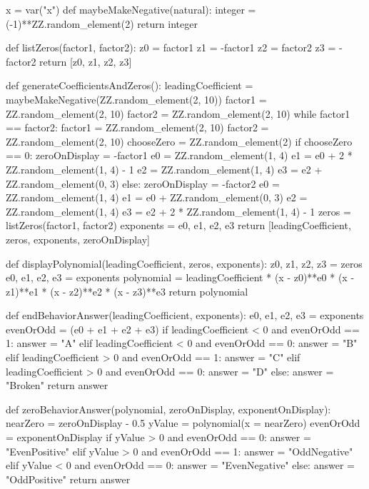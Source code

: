 \documentclass{ximera}
\begin{document}
\begin{sagesilent}
x = var("x")
def maybeMakeNegative(natural):
    integer = (-1)**ZZ.random_element(2)
    return integer 

def listZeros(factor1, factor2):
    z0 = factor1
    z1 = -factor1
    z2 = factor2
    z3 = -factor2
    return [z0, z1, z2, z3]

def generateCoefficientsAndZeros():
    leadingCoefficient = maybeMakeNegative(ZZ.random_element(2, 10))
    factor1 = ZZ.random_element(2, 10)
    factor2 = ZZ.random_element(2, 10)
    while factor1 == factor2:
        factor1 = ZZ.random_element(2, 10)
        factor2 = ZZ.random_element(2, 10)
    chooseZero = ZZ.random_element(2)
    if chooseZero == 0:
        zeroOnDisplay = -factor1
        e0 = ZZ.random_element(1, 4)
        e1 = e0 + 2 * ZZ.random_element(1, 4) - 1
        e2 = ZZ.random_element(1, 4)
        e3 = e2 + ZZ.random_element(0, 3)
    else: 
        zeroOnDisplay = -factor2
        e0 = ZZ.random_element(1, 4)
        e1 = e0 + ZZ.random_element(0, 3)
        e2 = ZZ.random_element(1, 4)
        e3 = e2 + 2 * ZZ.random_element(1, 4) - 1
    zeros = listZeros(factor1, factor2)
    exponents = e0, e1, e2, e3
    return [leadingCoefficient, zeros, exponents, zeroOnDisplay]

def displayPolynomial(leadingCoefficient, zeros, exponents):
    z0, z1, z2, z3 = zeros
    e0, e1, e2, e3 = exponents 
    polynomial = leadingCoefficient * (x - z0)**e0 * (x - z1)**e1 * (x - z2)**e2 * (x - z3)**e3
    return polynomial 

def endBehaviorAnswer(leadingCoefficient, exponents):
    e0, e1, e2, e3 = exponents 
    evenOrOdd = (e0 + e1 + e2 + e3) %
    if leadingCoefficient < 0 and evenOrOdd == 1:
        answer = "A"
    elif leadingCoefficient < 0 and evenOrOdd == 0:
        answer = "B"
    elif leadingCoefficient > 0 and evenOrOdd == 1:
        answer = "C"
    elif leadingCoefficient > 0 and evenOrOdd == 0:
        answer = "D"
    else: 
        answer = "Broken"
    return answer 

def zeroBehaviorAnswer(polynomial, zeroOnDisplay, exponentOnDisplay): 
    nearZero = zeroOnDisplay - 0.5
    yValue = polynomial(x = nearZero)
    evenOrOdd = exponentOnDisplay %
    if yValue > 0 and evenOrOdd == 0:
        answer = "EvenPositive"
    elif yValue > 0 and evenOrOdd == 1:
        answer = "OddNegative"
    elif yValue < 0 and evenOrOdd == 0:
        answer = "EvenNegative"
    else:
        answer = "OddPositive"
    return answer


\end{sagesilent}
\end{document}

